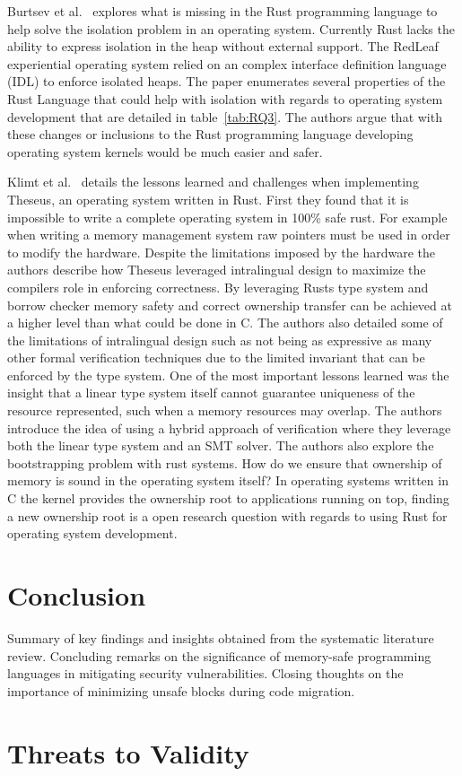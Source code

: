\documentclass[sigconf]{acmart}
\begin{document}
Burtsev et al.~\cite{Burtsev2021-mh} explores what is missing in the Rust programming language to help solve the isolation problem in an operating system. Currently Rust lacks the ability to express isolation in the heap without external support. The RedLeaf experiential operating system relied on an complex interface definition language (IDL) to enforce isolated heaps. The paper enumerates several properties of the Rust Language that could help with isolation with regards to operating system development that are detailed in table~\ref{tab:RQ3}. The authors argue that with these changes or inclusions to the Rust programming language developing operating system kernels would be much easier and safer.

Klimt et al.~\cite{Klimt2023-ob} details the lessons learned and challenges when implementing Theseus, an operating system written in Rust. First they found that it is impossible to write a complete operating system in 100\% safe rust. For example when writing a memory management system raw pointers must be used in order to modify the hardware. Despite the limitations imposed by the hardware the authors describe how Theseus leveraged intralingual design to maximize the compilers role in enforcing correctness. By leveraging Rusts type system and borrow checker memory safety and correct ownership transfer can be achieved at a higher level than what could be done in C. The authors also detailed some of the limitations of intralingual design such as not being as expressive as many other formal verification techniques due to the limited invariant that can be enforced by the type system. One of the most important lessons learned was the insight that a linear type system itself cannot guarantee uniqueness of the resource represented, such when a memory resources may overlap. The authors introduce the idea of using a hybrid approach of verification where they leverage both the linear type system and an SMT solver. The authors also explore the bootstrapping problem with rust systems. How do we ensure that ownership of memory is sound in the operating system itself? In operating systems written in C the kernel provides the ownership root to applications running on top, finding a new ownership root is a open research question with regards to using Rust for operating system development.

\section{Conclusion}

Summary of key findings and insights obtained from the systematic literature review.
Concluding remarks on the significance of memory-safe programming languages in mitigating security vulnerabilities.
Closing thoughts on the importance of minimizing unsafe blocks during code migration.

\section{Threats to Validity}
\balance



\end{document}

